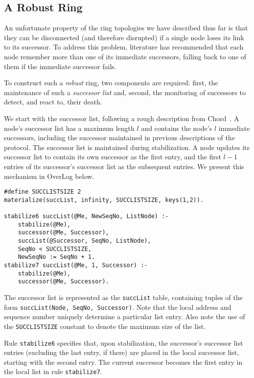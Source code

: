 \documentclass{article}
\begin{document}
\subsection{A Robust Ring}
\label{sec:robustRing}
An unfortunate property of the ring topologies we have described thus
far is that they can be disconnected (and therefore disrupted) if a
single node loses its link to its successor. To address this problem,
literature has recommended that each node remember more than one of its
immediate successors, falling back to one of them if the immediate
successor fails.

To construct such a \emph{robust} ring, two components are required:
first, the maintenance of such a \emph{successor list} and, second, the
monitoring of successors to detect, and react to, their death.

We start
with the successor list, following a rough description from
Chord~\cite{Stoica2003}. A node's successor list has a maximum length
$l$ and contains the node's $l$ immediate successors, including the
successor maintained in previous descriptions of the protocol. The
successor list is maintained during stabilization. A node updates its
successor list to contain its own successor as the first entry, and the
first $l-1$ entries of its successor's successor list as the subsequent
entries. We present this mechanism in OverLog below.
\begin{lstlisting}
#define SUCCLISTSIZE 2
materialize(succList, infinity, SUCCLISTSIZE, keys(1,2)).

stabilize6 succList(@Me, NewSeqNo, ListNode) :-
	stabilize(@Me),
	successor(@Me, Successor),
	succList(@Successor, SeqNo, ListNode),
	SeqNo < SUCCLISTSIZE,
	NewSeqNo := SeqNo + 1.
stabilize7 succList(@Me, 1, Successor) :-
	stabilize(@Me),
	successor(@Me, Successor).
\end{lstlisting}
The successor list is represented as the \lstinline$succList$ table,
containing tuples of the form \lstinline$succList(Node, SeqNo, Successor)$.
Note that the local address and sequence number uniquely
determine a particular list entry. Also note the use of the
\texttt{SUCCLISTSIZE} constant to denote the maximum size of the list.

Rule \lstinline$stabilize6$ specifies that, upon stabilization, the
successor's successor list entries (excluding the last entry, if there)
are placed in the local successor list, starting with the second entry.
The current successor becomes the first entry in the local list in rule
\lstinline$stabilize7$.
\end{document}
